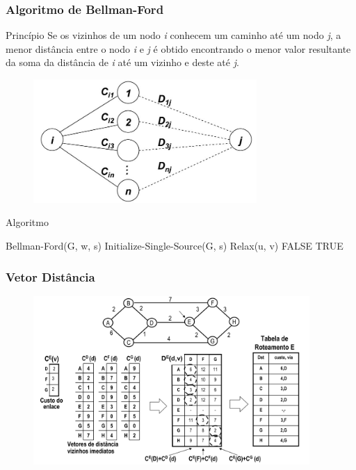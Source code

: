 \documentclass{beamer}
\begin{document}
\begin{frame}
\frametitle{Algoritmo de Bellman-Ford}
\begin{block}{Princípio}
Se os vizinhos de um nodo \emph{i} conhecem um caminho até um nodo \emph{j}, a menor distância
entre o nodo \emph{i} e \emph{j} é obtido encontrando o menor valor resultante
da soma da distância de \emph{i} até um vizinho e deste até \emph{j}.
\end{block}
\begin{figure}[htp]
\begin{center}
  \includegraphics[width=85mm]{Imagens/BellmanFord.jpeg}
  \label{bellman_ford}
\end{center}
\end{figure}
\end{frame}

\begin{frame}
\begin{block}{Algoritmo}
\begin{algorithmic}
    \STATE Bellman-Ford(G, w, s)
    \STATE Initialize-Single-Source(G, s)
    		\STATE Relax(u, v)
    	\ENDFOR
    \ENDFOR 
    		\RETURN FALSE
    	\ENDIF
   	\ENDFOR
   	\RETURN TRUE
\end{algorithmic}
\end{block}
\end{frame}

\begin{frame}
\frametitle{Vetor Distância}
\begin{figure}[htp]
\begin{center}
  \includegraphics[width=105mm]{Imagens/VetorDistancia.png}
  \label{vetor_distancia}
\end{center}
\end{figure}
\end{frame}
\end{document}
